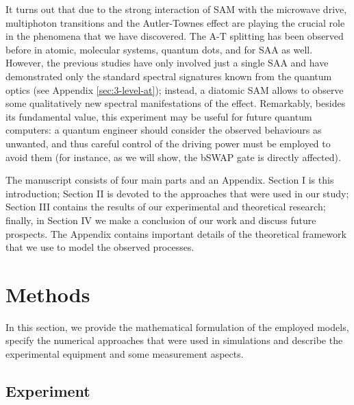 \documentclass[%
 aip,
 amsmath,amssymb,
 reprint,%
]{revtex4-1}
\begin{document}
It turns out that due to the strong interaction of SAM with the microwave drive, multiphoton transitions and the Autler-Townes effect are playing the crucial role in the phenomena that we have discovered. The A-T splitting has been observed before in atomic\cite{picque1976direct}, molecular systems\cite{tamarat1995pump}, quantum dots\cite{xu2007coherent}, and for SAA as well\cite{baur2009measurement, sillanpaa2009autler, novikov2013autler, suri2013observation, peng2018vacuum}. However, the previous studies have  only involved just a single SAA and have demonstrated only the standard spectral signatures known from the quantum optics (see Appendix \ref{sec:3-level-at}); instead, a diatomic SAM allows to observe some qualitatively new spectral manifestations of the effect. Remarkably, besides its fundamental value, this experiment may be useful for future quantum computers: a quantum engineer should consider the observed behaviours as unwanted, and thus careful control of the driving power must be employed to avoid them (for instance, as we will show, the bSWAP gate\cite{poletto2012entanglement} is directly affected).

The manuscript consists of four main parts and an Appendix. Section I is this introduction; Section II is devoted to the approaches that were used in our study; Section III contains the results of our experimental and theoretical research; finally, in Section IV we make a conclusion of our work and discuss future prospects. The Appendix contains important details of the theoretical framework that we use to model the observed processes.

\section{Methods}

In this section, we provide the mathematical formulation of the employed models, specify the numerical approaches that were used in simulations and describe the experimental equipment and some measurement aspects.  

\subsection{Experiment}
\end{document}

